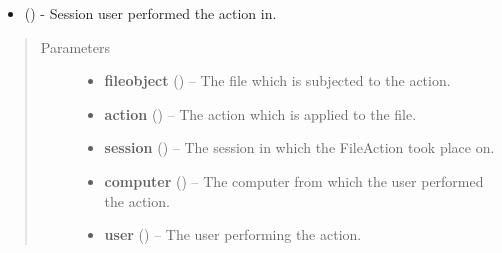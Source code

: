 \documentclass[letterpaper,10pt,english]{sphinxmanual}
\begin{document}
\begin{fulllineitems}
\begin{description}
\begin{itemize}
\item {} 
 ()        - Session user performed the action in.

\end{itemize}

\end{description}
\begin{quote}\begin{description}
\item[{Parameters}] \leavevmode\begin{itemize}
\item {} 
\textbf{fileobject} ({\hyperref[models:models.File]{}}) -- The file which is subjected to the action.

\item {} 
\textbf{action} ({\hyperref[models:models.Action]{}}) -- The action which is applied to the file.

\item {} 
\textbf{session} ({\hyperref[models:models.Session]{}}) -- The session in which the FileAction took place on.

\item {} 
\textbf{computer} ({\hyperref[models:models.Computer]{}}) -- The computer from which the user performed the action.

\item {} 
\textbf{user} ({\hyperref[models:models.User]{}}) -- The user performing the action.

\end{itemize}

\end{description}\end{quote}

\end{fulllineitems}

\end{document}
